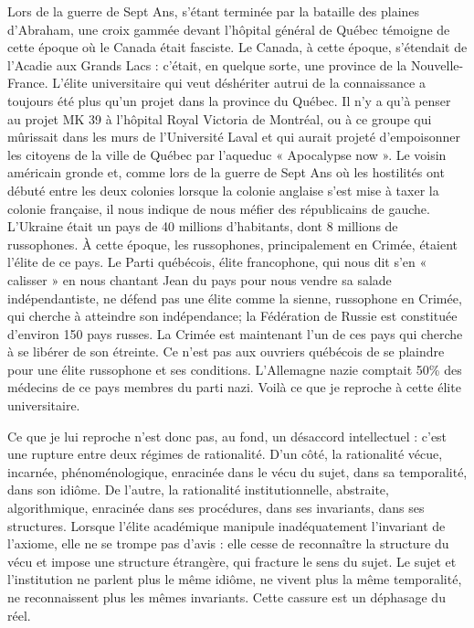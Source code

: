 \documentclass[11pt,a4paper]{article}
\begin{document}
Lors de la guerre de Sept Ans, s'étant terminée par la bataille des plaines d'Abraham, une croix gammée devant l'hôpital général de Québec témoigne de cette époque où le Canada était fasciste. Le Canada, à cette époque, s'étendait de l'Acadie aux Grands Lacs : c'était, en quelque sorte, une province de la Nouvelle-France. L'élite universitaire qui veut déshériter autrui de la connaissance a toujours été plus qu'un projet dans la province du Québec. Il n'y a qu'à penser au projet MK 39 à l'hôpital Royal Victoria de Montréal, ou à ce groupe qui mûrissait dans les murs de l'Université Laval et qui aurait projeté d'empoisonner les citoyens de la ville de Québec par l'aqueduc « Apocalypse now ». Le voisin américain gronde et, comme lors de la guerre de Sept Ans où les hostilités ont débuté entre les deux colonies lorsque la colonie anglaise s'est mise à taxer la colonie française, il nous indique de nous méfier des républicains de gauche. L'Ukraine était un pays de 40 millions d'habitants, dont 8 millions de russophones. À cette époque, les russophones, principalement en Crimée, étaient l'élite de ce pays. Le Parti québécois, élite francophone, qui nous dit s'en « calisser » en nous chantant Jean du pays pour nous vendre sa salade indépendantiste, ne défend pas une élite comme la sienne, russophone en Crimée, qui cherche à atteindre son indépendance; la Fédération de Russie est constituée d'environ 150 pays russes. La Crimée est maintenant l'un de ces pays qui cherche à se libérer de son étreinte. Ce n'est pas aux ouvriers québécois de se plaindre pour une élite russophone et ses conditions. L'Allemagne nazie comptait 50\% des médecins de ce pays membres du parti nazi. Voilà ce que je reproche à cette élite universitaire.

Ce que je lui reproche n'est donc pas, au fond, un désaccord intellectuel : c'est une rupture entre deux régimes de rationalité. D'un côté, la rationalité vécue, incarnée, phénoménologique, enracinée dans le vécu du sujet, dans sa temporalité, dans son idiôme. De l'autre, la rationalité institutionnelle, abstraite, algorithmique, enracinée dans ses procédures, dans ses invariants, dans ses structures. Lorsque l'élite académique manipule inadéquatement l'invariant de l'axiome, elle ne se trompe pas d'avis : elle cesse de reconnaître la structure du vécu et impose une structure étrangère, qui fracture le sens du sujet. Le sujet et l'institution ne parlent plus le même idiôme, ne vivent plus la même temporalité, ne reconnaissent plus les mêmes invariants. Cette cassure est un déphasage du réel.
\end{document}

